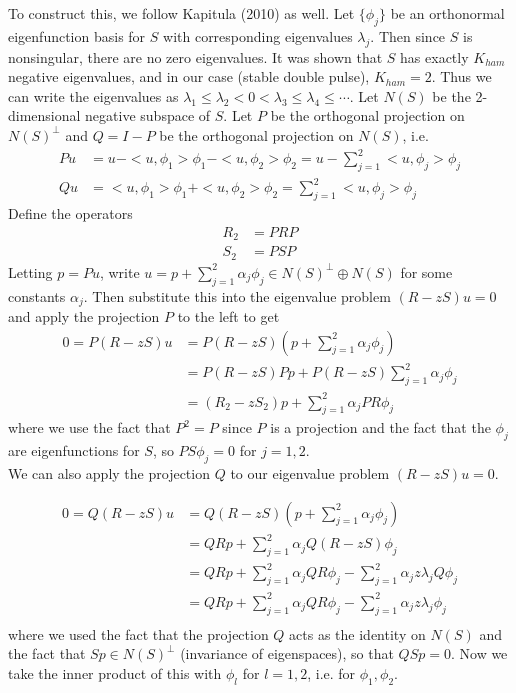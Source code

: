 \documentclass[12pt]{article}
\begin{document}
To construct this, we follow Kapitula (2010) as well. Let $\{\phi_j\}$ be an orthonormal eigenfunction basis for $S$ with corresponding eigenvalues $\lambda_j$. Then since $S$ is nonsingular, there are no zero eigenvalues. It was shown that $S$ has exactly $K_{ham}$ negative eigenvalues, and in our case (stable double pulse), $K_{ham} = 2$. Thus we can write the eigenvalues as $\lambda_1 \leq \lambda_2 < 0 < \lambda_3 \leq \lambda_4 \leq \cdots$. Let $N(S)$ be the 2-dimensional negative subspace of $S$. Let $P$ be the orthogonal projection on $N(S)^\perp$ and $Q = I - P$ be the orthogonal projection on $N(S)$, i.e.
\begin{align}
Pu &= u - <u,\phi_1>\phi_1 - <u, \phi_2>\phi_2 = u - \sum_{j=1}^2 <u, \phi_j>\phi_j\\
Qu &= <u,\phi_1>\phi_1 + <u, \phi_2>\phi_2 = \sum_{j=1}^2 <u, \phi_j>\phi_j
\end{align}
Define the operators
\begin{align}
R_2 &= PRP \\
S_2 &= PSP
\end{align}
Letting $p = Pu$, write $u = p + \sum_{j=1}^2 \alpha_j \phi_j \in N(S)^\perp \oplus N(S)$ for some constants $\alpha_j$. Then substitute this into the eigenvalue problem $(R - zS)u = 0$ and apply the projection $P$ to the left to get
\begin{align}
0 = P(R - zS)u &= P(R - zS)(p + \sum_{j=1}^2 \alpha_j \phi_j) \\
&= P(R - zS)Pp + P(R - zS)\sum_{j=1}^2 \alpha_j \phi_j \\
&= (R_2 - z S_2)p + \sum_{j=1}^2 \alpha_j P R \phi_j
\end{align}
where we use the fact that $P^2 = P$ since $P$ is a projection and the fact that the $\phi_j$ are eigenfunctions for $S$, so $P S\phi_j = 0$ for $j = 1, 2$.\\

We can also apply the projection $Q$ to our eigenvalue problem $(R - zS)u = 0$.

\begin{align}
0 = Q(R - zS)u &= Q(R - zS)(p + \sum_{j=1}^2 \alpha_j \phi_j) \\
&= QRp + \sum_{j=1}^2 \alpha_j Q(R - zS) \phi_j \\
&= QRp + \sum_{j=1}^2 \alpha_j Q R \phi_j - \sum_{j=1}^2 \alpha_j z \lambda_j Q \phi_j \\
&= QRp + \sum_{j=1}^2 \alpha_j Q R \phi_j - \sum_{j=1}^2 \alpha_j z \lambda_j \phi_j \\
\end{align}
where we used the fact that the projection $Q$ acts as the identity on $N(S)$ and the fact that $Sp \in N(S)^\perp$ (invariance of eigenspaces), so that $QSp = 0$. Now we take the inner product of this with $\phi_l$ for $l = 1, 2$, i.e. for $\phi_1, \phi_2$.
\end{document}
